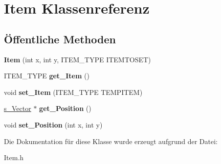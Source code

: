 \hypertarget{class_item}{\section{Item Klassenreferenz}
\label{class_item}
}
\subsection*{Öffentliche Methoden}
\begin{DoxyCompactItemize}
\item 
\hypertarget{class_item_ae203ad5350de1aa73defd90973e055f0}{{\bfseries Item} (int x, int y, I\-T\-E\-M\-\_\-\-T\-Y\-P\-E I\-T\-E\-M\-T\-O\-S\-E\-T)}\label{class_item_ae203ad5350de1aa73defd90973e055f0}

\item 
\hypertarget{class_item_afcee83c2911215a53019b9182a37eb9f}{I\-T\-E\-M\-\_\-\-T\-Y\-P\-E {\bfseries get\-\_\-\-Item} ()}\label{class_item_afcee83c2911215a53019b9182a37eb9f}

\item 
\hypertarget{class_item_a00a562954be3b3ce018676aea84d9a75}{void {\bfseries set\-\_\-\-Item} (I\-T\-E\-M\-\_\-\-T\-Y\-P\-E T\-E\-M\-P\-I\-T\-E\-M)}\label{class_item_a00a562954be3b3ce018676aea84d9a75}

\item 
\hypertarget{class_item_a8fbd971dcad6d5bffb887657db6f1a68}{\hyperlink{structs___vector}{s\-\_\-\-Vector} $\ast$ {\bfseries get\-\_\-\-Position} ()}\label{class_item_a8fbd971dcad6d5bffb887657db6f1a68}

\item 
\hypertarget{class_item_a71772937c1e153dbef03e583be74215a}{void {\bfseries set\-\_\-\-Position} (int x, int y)}\label{class_item_a71772937c1e153dbef03e583be74215a}

\end{DoxyCompactItemize}


Die Dokumentation für diese Klasse wurde erzeugt aufgrund der Datei\-:\begin{DoxyCompactItemize}
\item 
Item.\-h\end{DoxyCompactItemize}
